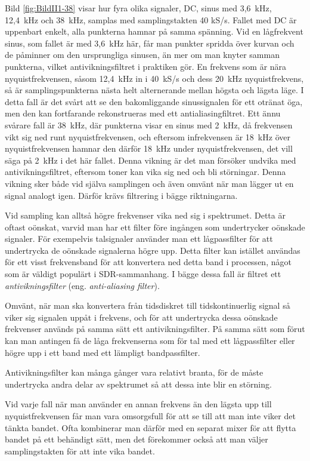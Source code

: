 Bild \ref{fig:BildII1-38} visar hur fyra olika signaler, DC, sinus med
3,6~kHz, 12,4~kHz och 38~kHz, samplas med samplingstakten 40 kS/s.
Fallet med DC är uppenbart enkelt, alla punkterna hamnar på samma spänning.
Vid en lågfrekvent sinus, som fallet är med 3,6~kHz här, får man punkter spridda
över kurvan och de påminner om den ursprungliga sinusen, än mer om man knyter
samman punkterna, vilket antivikningsfiltret i praktiken gör.
En frekvens som är nära nyquistfrekvensen, såsom 12,4~kHz in i 40~kS/s och
dess 20~kHz nyquistfrekvens, så är samplingspunkterna nästa helt alternerande
mellan högsta och lägsta läge. I detta fall är det svårt att se den bakomliggande
sinussignalen för ett otränat öga, men den kan fortfarande rekonstrueras med ett
antialiasingfiltret.
Ett ännu svårare fall är 38~kHz, där punkterna visar en sinus med 2~kHz, då
frekvensen vikt sig ned runt nyquistfrekvensen, och eftersom infrekvensen är
18~kHz över nyquistfrekvensen hamnar den därför 18~kHz under nyquistfrekvensen,
det vill säga på 2~kHz i det här fallet. Denna vikning är det man försöker undvika med
antivikningsfiltret, eftersom toner kan vika sig ned och bli störningar.
Denna vikning sker både vid själva samplingen och även omvänt när man lägger ut
en signal analogt igen. Därför krävs filtrering i bägge riktningarna.

Vid sampling kan alltså högre frekvenser vika ned sig i spektrumet.
Detta är oftast oönskat, varvid man har ett filter före ingången som
undertrycker oönskade signaler.
För exempelvis talsignaler använder man ett lågpassfilter för att undertrycka de
oönskade signalerna högre upp.
Detta filter kan istället användas för ett visst frekvensband för att
konvertera ned detta band i processen, något som är väldigt populärt i
SDR-sammanhang.
I bägge dessa fall är filtret ett \emph{antivikningsfilter} (eng.
\emph{anti-aliasing filter}).

Omvänt, när man ska konvertera från tidsdiskret till tidskontinuerlig
signal så viker sig signalen uppåt i frekvens, och för att undertrycka dessa
oönskade frekvenser används på samma sätt ett antivikningsfilter.
På samma sätt som förut kan man antingen få de låga frekvenserna som för tal
med ett lågpassfilter eller högre upp i ett band med ett lämpligt
bandpassfilter.

Antivikningsfilter kan många gånger vara relativt branta, för de måste
undertrycka andra delar av spektrumet så att dessa inte blir en störning.

Vid varje fall när man använder en annan frekvens än den lägsta upp till
nyquistfrekvensen får man vara omsorgsfull för att se till att man inte viker
det tänkta bandet.
Ofta kombinerar man därför med en separat mixer för att flytta bandet på ett
behändigt sätt, men det förekommer också att man väljer samplingstakten för att
inte vika bandet.

